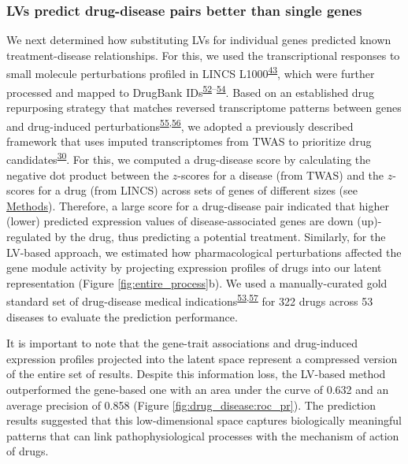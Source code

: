 \documentclass[
  a4paper,
]{article}
\begin{document}
\hypertarget{lvs-predict-drug-disease-pairs-better-than-single-genes}{%
\subsubsection{LVs predict drug-disease pairs better than single genes}\label{lvs-predict-drug-disease-pairs-better-than-single-genes}}

We next determined how substituting LVs for individual genes predicted known treatment-disease relationships.
For this, we used the transcriptional responses to small molecule perturbations profiled in LINCS L1000\textsuperscript{\protect\hyperlink{ref-F7lIlh2N}{43}}, which were further processed and mapped to DrugBank IDs\textsuperscript{\protect\hyperlink{ref-6PR8LEXK}{52}--\protect\hyperlink{ref-1DJZvtwP1}{54}}.
Based on an established drug repurposing strategy that matches reversed transcriptome patterns between genes and drug-induced perturbations\textsuperscript{\protect\hyperlink{ref-1ClBKizD7}{55},\protect\hyperlink{ref-mZjkE1xU}{56}}, we adopted a previously described framework that uses imputed transcriptomes from TWAS to prioritize drug candidates\textsuperscript{\protect\hyperlink{ref-17oeJ0CXy}{30}}.
For this, we computed a drug-disease score by calculating the negative dot product between the \(z\)-scores for a disease (from TWAS) and the \(z\)-scores for a drug (from LINCS) across sets of genes of different sizes (see \protect\hyperlink{sec:methods:drug}{Methods}).
Therefore, a large score for a drug-disease pair indicated that higher (lower) predicted expression values of disease-associated genes are down (up)-regulated by the drug, thus predicting a potential treatment.
Similarly, for the LV-based approach, we estimated how pharmacological perturbations affected the gene module activity by projecting expression profiles of drugs into our latent representation (Figure \ref{fig:entire_process}b).
We used a manually-curated gold standard set of drug-disease medical indications\textsuperscript{\protect\hyperlink{ref-O21tn8vf}{53},\protect\hyperlink{ref-10KA5jTBQ}{57}} for 322 drugs across 53 diseases to evaluate the prediction performance.

It is important to note that the gene-trait associations and drug-induced expression profiles projected into the latent space represent a compressed version of the entire set of results.
Despite this information loss, the LV-based method outperformed the gene-based one with an area under the curve of 0.632 and an average precision of 0.858 (Figure \ref{fig:drug_disease:roc_pr}).
The prediction results suggested that this low-dimensional space captures biologically meaningful patterns that can link pathophysiological processes with the mechanism of action of drugs.
\end{document}
